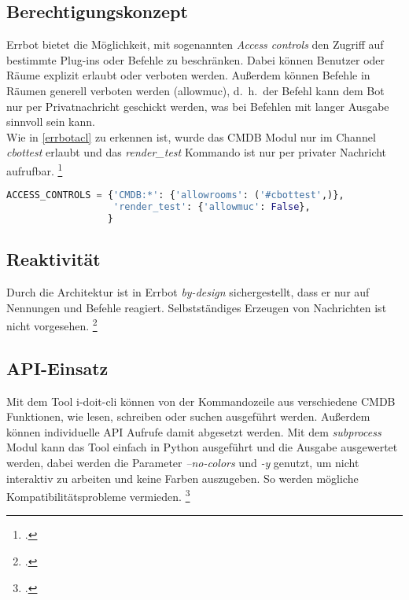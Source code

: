 \subsection{Berechtigungskonzept}
Errbot bietet die Möglichkeit, mit sogenannten \textit{Access controls} den Zugriff auf bestimmte Plug-ins oder Befehle zu beschränken. Dabei können Benutzer oder Räume explizit erlaubt oder verboten werden. Außerdem können Befehle in Räumen generell verboten werden (allowmuc), d.~h.~der Befehl kann dem Bot nur per Privatnachricht geschickt werden, was bei Befehlen mit langer Ausgabe sinnvoll sein kann.\\
Wie in \autoref{errbotacl} zu erkennen ist, wurde das \acs{CMDB} Modul nur im Channel \textit{cbottest} erlaubt und das \textit{render\_test} Kommando ist nur per privater Nachricht aufrufbar.
\footcite[Vgl.][o. \pno]{errbot_2018_config-template}

\newpage
\begin{lstlisting}[language=python, label=errbotacl, caption=Errbot Access controls]
ACCESS_CONTROLS = {'CMDB:*': {'allowrooms': ('#cbottest',)},
                   'render_test': {'allowmuc': False},
                  }
\end{lstlisting}

\subsection{Reaktivität}
Durch die Architektur ist in Errbot \textit{by-design} sichergestellt, dass er nur auf Nennungen und Befehle reagiert. Selbstständiges Erzeugen von Nachrichten ist nicht vorgesehen.
\footcite[Vgl.][o. \pno]{errbot_2018_mentions}

\subsection{API-Einsatz}
Mit dem Tool i-doit-cli können von der Kommandozeile aus verschiedene \acs{CMDB} Funktionen, wie lesen, schreiben oder suchen ausgeführt werden. Außerdem können individuelle API Aufrufe damit abgesetzt werden. Mit dem \textit{subprocess} Modul kann das Tool einfach in Python ausgeführt und die Ausgabe ausgewertet werden, dabei werden die Parameter \textit{--no-colors} und \textit{-y} genutzt, um nicht interaktiv zu arbeiten und keine Farben auszugeben. So werden mögliche Kompatibilitätsprobleme vermieden.
\footcite[Vgl.][o. \pno]{Heisig_2019_idoitcli}

